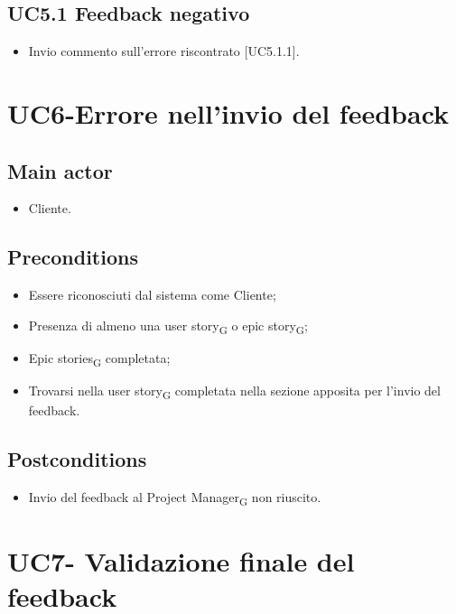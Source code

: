 \documentclass{article}
\begin{document}
    \subsection{UC5.1 Feedback negativo}
    \begin{itemize}
            \item Invio commento sull'errore riscontrato [UC5.1.1].
        \end{itemize}
        
\section{UC6-Errore nell'invio del feedback}

     \subsection*{Main actor}
     \begin{itemize}
         \item Cliente.
     \end{itemize}
     \subsection*{Preconditions} 
 \begin{itemize}
        \item Essere riconosciuti dal sistema come Cliente;
        \item Presenza di almeno una user story\textsubscript{G}  o epic story\textsubscript{G};
        \item Epic stories\textsubscript{G}  completata;
        \item Trovarsi nella user story\textsubscript{G}  completata nella sezione apposita per l'invio del feedback.
    \end{itemize}
     \subsection*{Postconditions} 
        \begin{itemize}
            \item Invio del feedback al Project Manager\textsubscript{G}  non riuscito.
        \end{itemize} 

        
\section{UC7- Validazione finale del feedback}
\end{document}
